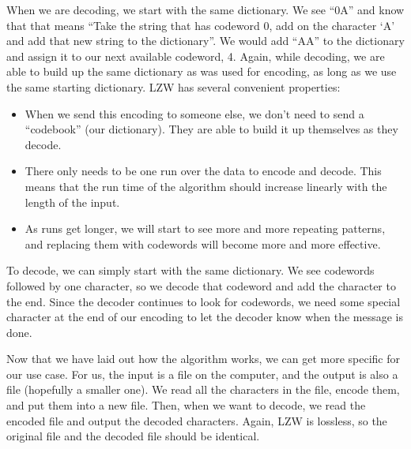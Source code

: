 \documentclass[12pt,twoside]{reedthesis}
\providecommand{\tightlist}{%
  \setlength{\itemsep}{0pt}\setlength{\parskip}{0pt}}
\begin{document}
When we are decoding, we start with the same dictionary. We see ``0A'' and know that that means ``Take the string that has codeword 0, add on the character `A' and add that new string to the dictionary''. We would add ``AA'' to the dictionary and assign it to our next available codeword, 4. Again, while decoding, we are able to build up the same dictionary as was used for encoding, as long as we use the same starting dictionary.
LZW has several convenient properties:
\begin{itemize}
\tightlist
\item
  When we send this encoding to someone else, we don't need to send a ``codebook'' (our dictionary). They are able to build it up themselves as they decode.
\item
  There only needs to be one run over the data to encode and decode. This means that the run time of the algorithm should increase linearly with the length of the input.
\item
  As runs get longer, we will start to see more and more repeating patterns, and replacing them with codewords will become more and more effective.
\end{itemize}
To decode, we can simply start with the same dictionary. We see codewords followed by one character, so we decode that codeword and add the character to the end. Since the decoder continues to look for codewords, we need some special character at the end of our encoding to let the decoder know when the message is done.

Now that we have laid out how the algorithm works, we can get more specific for our use case. For us, the input is a file on the computer, and the output is also a file (hopefully a smaller one). We read all the characters in the file, encode them, and put them into a new file. Then, when we want to decode, we read the encoded file and output the decoded characters. Again, LZW is lossless, so the original file and the decoded file should be identical.
\end{document}
